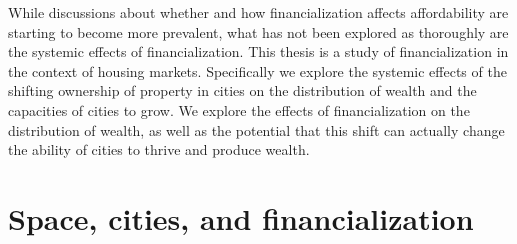 While discussions about whether and how financialization affects affordability are starting to become more prevalent, what has not been explored as thoroughly are the systemic effects of financialization.  %
This thesis is a study of financialization in the context of housing markets. Specifically we explore the systemic effects of the shifting ownership of property in cities on the distribution of wealth and the capacities of cities to grow. We explore the effects of financialization on the distribution of wealth, as well as the potential that this shift can actually change the ability of cities to thrive and produce wealth.
 






\section{Space, cities, and financialization}


